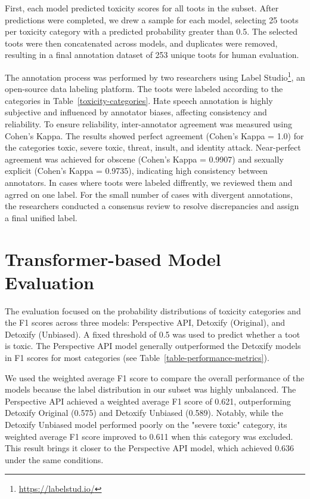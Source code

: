 First, each model predicted toxicity scores for all toots in the subset. After predictions were completed, we drew a sample for each model, selecting 25 toots per toxicity category with a predicted probability greater than 0.5. The selected toots were then concatenated across models, and duplicates were removed, resulting in a final annotation dataset of 253 unique toots for human evaluation.

The annotation process was performed by two researchers using Label Studio\footnote{\url{https://labelstud.io/}}, an open-source data labeling platform. The toots were labeled according to the categories in Table~\ref{toxicity-categories}. Hate speech annotation is highly subjective and influenced by annotator biases, affecting consistency and reliability. To ensure reliability, inter-annotator agreement was measured using Cohen's Kappa. The results showed perfect agreement (Cohen's Kappa = 1.0) for the categories toxic, severe toxic, threat, insult, and identity attack. Near-perfect agreement was achieved for obscene (Cohen's Kappa = 0.9907) and sexually explicit (Cohen's Kappa = 0.9735), indicating high consistency between annotators. In cases where toots were labeled diffrently, we reviewed them and agrred on one label. For the small number of cases with divergent annotations, the researchers conducted a consensus review to resolve discrepancies and assign a final unified label.

\section{Transformer-based Model Evaluation} \label{evaluation}
The evaluation focused on the probability distributions of toxicity categories and the F1 scores across three models: Perspective API, Detoxify (Original), and Detoxify (Unbiased). A fixed threshold of 0.5 was used to predict whether a toot is toxic. The Perspective API model generally outperformed the Detoxify models in F1 scores for most categories (see Table~\ref{table-performance-metrics}).

We used the weighted average F1 score to compare the overall performance of the models because the label distribution in our subset was highly unbalanced. The Perspective API achieved a weighted average F1 score of 0.621, outperforming Detoxify Original (0.575) and Detoxify Unbiased (0.589). Notably, while the Detoxify Unbiased model performed poorly on the "severe toxic" category, its weighted average F1 score improved to 0.611 when this category was excluded. This result brings it closer to the Perspective API model, which achieved 0.636 under the same conditions.

